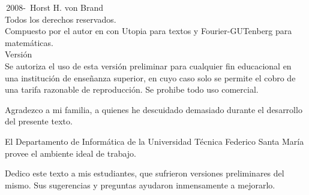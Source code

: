 \documentclass[czech, english, german, french, latin, spanish, fleqn]
	      {memoir}
\theoremstyle{plain}
\theoremstyle{definition}
\theoremstyle{remark}
\begin{document}
\clearpage



\thispagestyle{empty}
\vspace*{2ex}
\begin{small}
  \noindent
  \textcopyright\,2008-\the\year\ Horst H. von Brand \\
  Todos los derechos reservados.\\[1.2em]
  Compuesto por el autor en \LaTeXe{} con Utopia para textos
  y Fourier-GUTenberg para matemáticas.\\[2em]
  Versión \classversion \\[0.7em]
  Se autoriza el uso de esta versión preliminar
  para cualquier fin educacional
  en una institución de enseñanza superior,
  en cuyo caso solo se permite
  el cobro de una tarifa razonable de reproducción.
  Se prohibe todo uso comercial.
\end{small}

\cleardoublepage


\thispagestyle{empty}
\vspace*{\fill}
\vspace*{\fill}
\noindent
Agradezco a mi familia,
a quienes he descuidado demasiado
durante el desarrollo del presente texto.

\vspace*{\baselineskip}
\noindent
El Departamento de Informática
de la Universidad Técnica Federico Santa María
provee el ambiente ideal de trabajo.

\vspace*{\baselineskip}
\noindent
Dedico este texto a mis estudiantes,
que sufrieron versiones preliminares del mismo.
Sus sugerencias y preguntas
ayudaron inmensamente a mejorarlo.
\vspace*{\fill}

\cleardoublepage

\tableofcontents

\clearpage

\listoffigures

\clearpage

\listoftables

\clearpage

\lstlistoflistings

\clearpage

\listofalgorithms

\cleardoublepage

\thispagestyle{plain}

\end{document}
